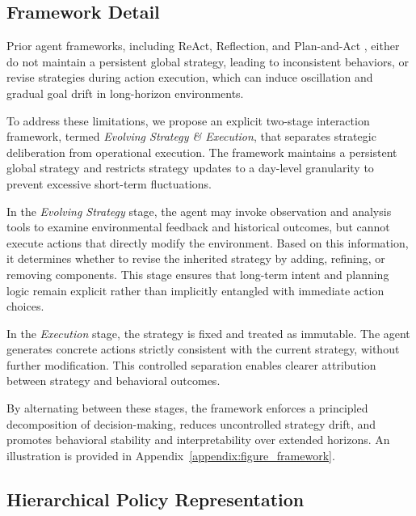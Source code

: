 \subsection{Framework Detail}
\label{sec:two_stage_framework}

Prior agent frameworks, including ReAct, Reflection, and Plan-and-Act \citep{2025planandact, yao2023react}, either do not maintain a persistent global strategy, leading to inconsistent behaviors, or revise strategies during action execution, which can induce oscillation and gradual goal drift in long-horizon environments.

To address these limitations, we propose an explicit two-stage interaction framework, termed \textit{Evolving Strategy \& Execution}, that separates strategic deliberation from operational execution. The framework maintains a persistent global strategy and restricts strategy updates to a day-level granularity to prevent excessive short-term fluctuations.

In the \textit{Evolving Strategy} stage, the agent may invoke observation and analysis tools to examine environmental feedback and historical outcomes, but cannot execute actions that directly modify the environment. Based on this information, it determines whether to revise the inherited strategy by adding, refining, or removing components. This stage ensures that long-term intent and planning logic remain explicit rather than implicitly entangled with immediate action choices.

In the \textit{Execution} stage, the strategy is fixed and treated as immutable. The agent generates concrete actions strictly consistent with the current strategy, without further modification. This controlled separation enables clearer attribution between strategy and behavioral outcomes.

By alternating between these stages, the framework enforces a principled decomposition of decision-making, reduces uncontrolled strategy drift, and promotes behavioral stability and interpretability over extended horizons. An illustration is provided in Appendix~\ref{appendix:figure_framework}.

\subsection{Hierarchical Policy Representation}
\label{sec:policy}

